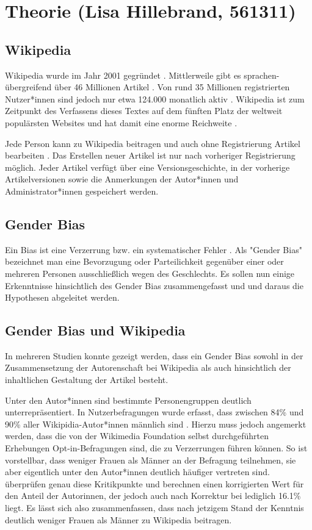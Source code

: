 \documentclass[11pt]{article}
\begin{document}
\section{Theorie (Lisa Hillebrand, 561311)}
\subsection{Wikipedia}
Wikipedia wurde im Jahr 2001 gegründet \parencite{wikipediaTimeline}. Mittlerweile gibt es sprachen- übergreifend über 46 Millionen Artikel \parencite{wikipedia_Size}. Von rund 35 Millionen registrierten Nutzer*innen sind jedoch nur etwa 124.000 monatlich aktiv \parencite{wikipedians}. Wikipedia ist zum Zeitpunkt des Verfassens dieses Textes auf dem fünften Platz der weltweit populärsten Websites und hat damit eine enorme Reichweite \parencite{Alexa2019}.

Jede Person kann zu Wikipedia beitragen und auch ohne Registrierung Artikel bearbeiten \parencite{wikipediaTutorial}. Das Erstellen neuer Artikel ist nur nach vorheriger Registrierung möglich. Jeder Artikel verfügt über eine Versionsgeschichte, in der vorherige Artikelversionen sowie die Anmerkungen der Autor*innen und Administrator*innen gespeichert werden.

\subsection{Gender Bias}

Ein Bias ist eine Verzerrung bzw. ein systematischer Fehler \parencite{Wirtz}. Als "Gender Bias" bezeichnet man eine Bevorzugung oder Parteilichkeit gegenüber einer oder mehreren Personen ausschließlich wegen des Geschlechts. Es sollen nun einige Erkenntnisse hinsichtlich des Gender Bias zusammengefasst und und daraus die Hypothesen abgeleitet werden.

\subsection{Gender Bias und Wikipedia}
In mehreren Studien konnte gezeigt werden, dass ein Gender Bias sowohl in der Zusammensetzung der Autorenschaft bei Wikipedia als auch hinsichtlich der inhaltlichen Gestaltung der Artikel besteht. 

Unter den Autor*innen sind bestimmte Personengruppen deutlich unterrepräsentiert. In Nutzerbefragungen wurde erfasst, dass zwischen 84\% und 90\% aller Wikipidia-Autor*innen männlich sind \parencite{wikimediaReport,GraellsGarrido2015}. Hierzu muss jedoch angemerkt werden, dass die von der Wikimedia Foundation selbst durchgeführten Erhebungen Opt-in-Befragungen sind, die zu Verzerrungen führen können. So ist vorstellbar, dass weniger Frauen als Männer an der Befragung teilnehmen, sie aber eigentlich unter den Autor*innen deutlich häufiger vertreten sind. \textcite{Hill2013} überprüfen genau diese Kritikpunkte und berechnen einen korrigierten Wert für den Anteil der Autorinnen, der jedoch auch nach Korrektur bei lediglich 16.1\% liegt. Es lässt sich also zusammenfassen, dass nach jetzigem Stand der Kenntnis deutlich weniger Frauen als Männer zu Wikipedia beitragen.
\end{document}
